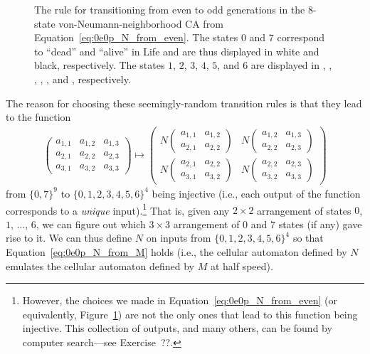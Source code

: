\begin{figure}[!htb]
	\caption{The rule for transitioning from even to odd generations in the $8$-state von-Neumann-neighborhood CA from Equation~\eqref{eq:0e0p_N_from_even}. The states $0$ and $7$ correspond to ``dead'' and ``alive'' in Life and are thus displayed in white and black, respectively. The states $1$, $2$, $3$, $4$, $5$, and $6$ are displayed in , , , , , and , respectively.}\label{fig:0e0p_rule_em}
\end{figure}

The reason for choosing these seemingly-random transition rules is that they lead to the function
\begin{align}\label{eq:0e0p_injective_transition}
	\begin{pmatrix}
		a_{1,1} & a_{1,2} & a_{1,3} \\
		a_{2,1} & a_{2,2} & a_{2,3} \\
		a_{3,1} & a_{3,2} & a_{3,3}
	\end{pmatrix} \mapsto \begin{pmatrix}
		N\begin{pmatrix}
		a_{1,1} & a_{1,2} \\
		a_{2,1} & a_{2,2}
		\end{pmatrix} & N\begin{pmatrix}
		a_{1,2} & a_{1,3} \\
		a_{2,2} & a_{2,3}
		\end{pmatrix} \\
		N\begin{pmatrix}
		a_{2,1} & a_{2,2} \\
		a_{3,1} & a_{3,2}
		\end{pmatrix} & N\begin{pmatrix}
		a_{2,2} & a_{2,3} \\
		a_{3,2} & a_{3,3}
		\end{pmatrix}
	\end{pmatrix}
\end{align}
from $\{0,7\}^9$ to $\{0,1,2,3,4,5,6\}^4$ being injective (i.e., each output of the function corresponds to a \emph{unique} input).\footnote{However, the choices we made in Equation~\eqref{eq:0e0p_N_from_even} (or equivalently, Figure~\ref{fig:0e0p_rule_em}) are not the only ones that lead to this function being injective. This collection of outputs, and many others, can be found by computer search---see Exercise~??.} That is, given any $2 \times 2$ arrangement of states $0$, $1$, $\ldots$, $6$, we can figure out which $3 \times 3$ arrangement of $0$ and $7$ states (if any) gave rise to it. We can thus define $N$ on inputs from $\{0,1,2,3,4,5,6\}^4$ so that Equation~\eqref{eq:0e0p_N_from_M} holds (i.e., the cellular automaton defined by $N$ emulates the cellular automaton defined by $M$ at half speed).


